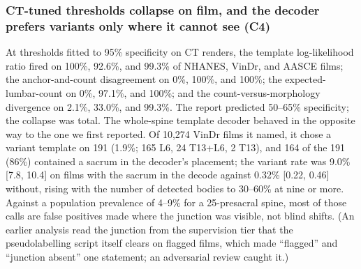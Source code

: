 \documentclass[11pt,letterpaper]{article}
\newcommand{\ci}[2]{[#1, #2]}
\begin{document}
\subsubsection*{CT-tuned thresholds collapse on film, and the decoder prefers variants only where it cannot see (C4)}
At thresholds fitted to 95\% specificity on CT renders, the template log-likelihood ratio fired on 100\%, 92.6\%, and 99.3\% of NHANES, VinDr, and AASCE films; the anchor-and-count disagreement on 0\%, 100\%, and 100\%; the expected-lumbar-count on 0\%, 97.1\%, and 100\%; and the count-versus-morphology divergence on 2.1\%, 33.0\%, and 99.3\%. The report predicted 50--65\% specificity; the collapse was total. The whole-spine template decoder behaved in the opposite way to the one we first reported. Of 10,274 VinDr films it named, it chose a variant template on 191 (1.9\%; 165 L6, 24 T13+L6, 2 T13), and 164 of the 191 (86\%) contained a sacrum in the decoder's placement; the variant rate was 9.0\% \ci{7.8}{10.4} on films with the sacrum in the decode against 0.32\% \ci{0.22}{0.46} without, rising with the number of detected bodies to 30--60\% at nine or more. Against a population prevalence of 4--9\% for a 25-presacral spine, most of those calls are false positives made where the junction was visible, not blind shifts. (An earlier analysis read the junction from the supervision tier that the pseudolabelling script itself clears on flagged films, which made ``flagged'' and ``junction absent'' one statement; an adversarial review caught it.)
\end{document}
